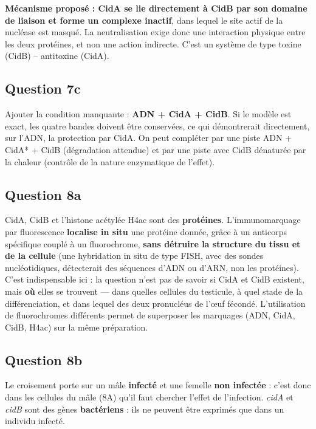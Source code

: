 \documentclass[11pt,a4paper]{article}
\begin{document}
\textbf{Mécanisme proposé : CidA se lie directement à CidB par son domaine de liaison et forme un complexe inactif}, dans lequel le site actif de la nucléase est masqué. La neutralisation exige donc une interaction physique entre les deux protéines, et non une action indirecte. C'est un système de type toxine (CidB) -- antitoxine (CidA).

\hypertarget{question-7c}{%
\subsection{Question 7c}\label{question-7c}}

Ajouter la condition manquante : \textbf{ADN + CidA + CidB}. Si le modèle est exact, les quatre bandes doivent être conservées, ce qui démontrerait directement, sur l'ADN, la protection par CidA. On peut compléter par une piste ADN + CidA* + CidB (dégradation attendue) et par une piste avec CidB dénaturée par la chaleur (contrôle de la nature enzymatique de l'effet).

\hypertarget{question-8a}{%
\subsection{Question 8a}\label{question-8a}}

CidA, CidB et l'histone acétylée H4ac sont des \textbf{protéines}. L'immunomarquage par fluorescence \textbf{localise in situ} une protéine donnée, grâce à un anticorps spécifique couplé à un fluorochrome, \textbf{sans détruire la structure du tissu et de la cellule} (une hybridation in situ de type FISH, avec des sondes nucléotidiques, détecterait des séquences d'ADN ou d'ARN, non les protéines). C'est indispensable ici : la question n'est pas de savoir si CidA et CidB existent, mais \textbf{où} elles se trouvent --- dans quelles cellules du testicule, à quel stade de la différenciation, et dans lequel des deux pronucléus de l'œuf fécondé. L'utilisation de fluorochromes différents permet de superposer les marquages (ADN, CidA, CidB, H4ac) sur la même préparation.

\hypertarget{question-8b}{%
\subsection{Question 8b}\label{question-8b}}

Le croisement porte sur un mâle \textbf{infecté} et une femelle \textbf{non infectée} : c'est donc dans les cellules du mâle (8A) qu'il faut chercher l'effet de l'infection. \emph{cidA} et \emph{cidB} sont des gènes \textbf{bactériens} : ils ne peuvent être exprimés que dans un individu infecté.
\end{document}
